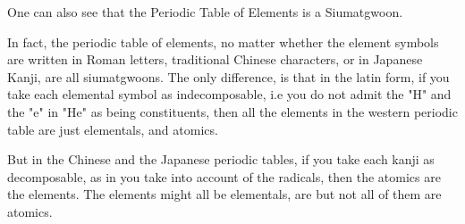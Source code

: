One can also see that the Periodic Table of Elements is a Siumatgwoon. 

In fact, the periodic table of elements, no matter whether the element symbols are written in Roman letters, traditional Chinese characters, or in Japanese Kanji, are all siumatgwoons. The only difference, is that in the latin form, if you take each elemental symbol as indecomposable, i.e you do not admit the "H" and the "e" in "He" as being constituents, then all the elements in the western periodic table are just elementals, and atomics. 

But in the Chinese and the Japanese periodic tables, if you take each kanji as decomposable, as in you take into account of the radicals, then the atomics are the elements. The elements might all be elementals, are but not all of them are atomics. 


